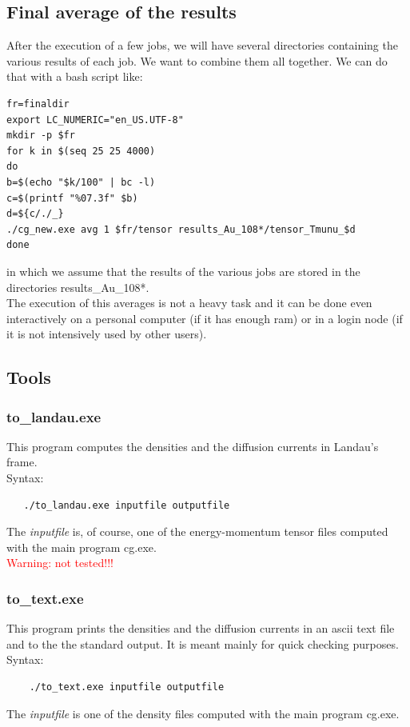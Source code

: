 \documentclass[12pt, a4paper]{article}
\begin{document}
\subsection{Final average of the results}
After the execution of a few jobs, we will have several directories containing the various results of each job. We want to combine them all together. We can do that with a bash script like:
\begin{verbatim}
fr=finaldir
export LC_NUMERIC="en_US.UTF-8"
mkdir -p $fr
for k in $(seq 25 25 4000)
do
b=$(echo "$k/100" | bc -l)
c=$(printf "%07.3f" $b)
d=${c/./_}
./cg_new.exe avg 1 $fr/tensor results_Au_108*/tensor_Tmunu_$d
done
\end{verbatim}
in which we assume that the results of the various jobs are stored in the directories results\_Au\_108*.\\
The execution of this averages is not a heavy task and it can be done even interactively on a personal computer (if it has enough ram) or in a login node (if it is not intensively used by other users).
\subsection{Tools}\label{tools} 
\subsubsection{to\_landau.exe}
This program computes the densities and the diffusion currents in Landau's frame.\\
Syntax:
\begin{footnotesize}
	\begin{verbatim}
   ./to_landau.exe inputfile outputfile
	\end{verbatim}
\end{footnotesize}
The \emph{inputfile} is, of course, one of the energy-momentum tensor files computed with the main program cg.exe.\\
\textcolor{red}{Warning: not tested!!!}
\subsubsection{to\_text.exe}
This program prints the densities and the diffusion currents in an ascii text file and to the the standard output. It is meant mainly for quick checking purposes.\\
Syntax:
\begin{footnotesize}
	\begin{verbatim}
	./to_text.exe inputfile outputfile
	\end{verbatim}
\end{footnotesize}
The \emph{inputfile} is one of the density files computed with the main program cg.exe.\\
\end{document}
